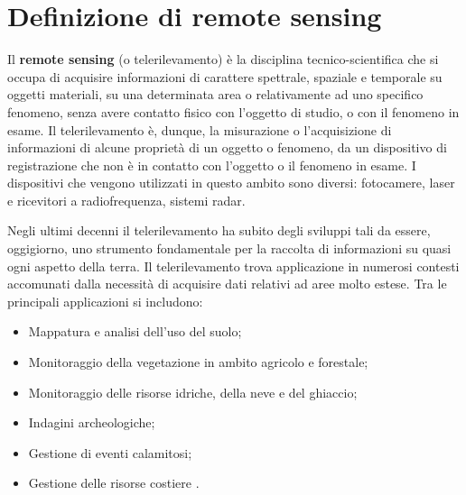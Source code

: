 \section{Definizione di remote sensing}
Il \textbf{remote sensing} (o telerilevamento) \cite{ALL1_REMOTE_SENSING, ALL2_REMOTE_SENSING,
ALL3_REMOTE_SENSING, ALL4_REMOTE_SENSING, ALL5_REMOTE_SENSING}  è la disciplina 
tecnico-scientifica che si occupa di acquisire informazioni di 
carattere spettrale, spaziale e temporale su 
oggetti materiali, su una determinata area o relativamente ad uno 
specifico fenomeno, senza avere contatto fisico con l’oggetto di 
studio, o con il fenomeno in esame. 
Il telerilevamento è, dunque, la misurazione o l'acquisizione di 
informazioni di alcune proprietà di un oggetto o fenomeno, da un 
dispositivo di registrazione che non è in contatto con l'oggetto o il 
fenomeno in esame.
I dispositivi che vengono utilizzati in questo ambito sono diversi: 
fotocamere, laser e ricevitori a radiofrequenza, sistemi radar.  


Negli ultimi decenni il telerilevamento ha subito degli sviluppi tali da essere, 
oggigiorno, uno strumento fondamentale per la raccolta di informazioni su quasi 
ogni aspetto della terra.  
Il telerilevamento trova applicazione in numerosi contesti accomunati 
dalla necessità di acquisire dati relativi ad aree molto estese. 
Tra le principali applicazioni si includono:
\begin{itemize}
    \item Mappatura e analisi dell'uso del suolo;
    \item Monitoraggio della vegetazione in ambito agricolo e forestale;
    \item Monitoraggio delle risorse idriche, della neve e del ghiaccio;
    \item Indagini archeologiche;
    \item Gestione di eventi calamitosi;
    \item Gestione delle risorse costiere \cite{ALL3_REMOTE_SENSING, Descrizione_Piattaforme}.
\end{itemize}

